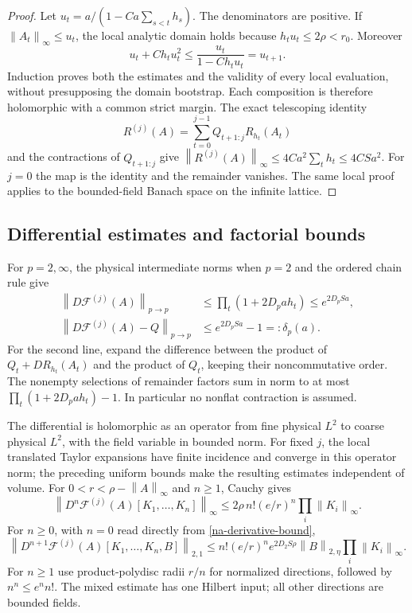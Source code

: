 \documentclass[11pt]{article}
\theoremstyle{remark}
\newcommand{\norm}[1]{\left\|#1\right\|}
\begin{document}
\begin{proof}
Let $u_t=a/(1-Ca\sum_{s<t}h_s)$. The denominators are positive.
If $\norm{A_t}_\infty\le u_t$, the local analytic domain holds
because $h_tu_t\le2\rho<r_0$. Moreover
\[
 u_t+Ch_tu_t^2\le\frac{u_t}{1-Ch_tu_t}=u_{t+1}.
\]
Induction proves both the estimates and the validity of every local
evaluation, without presupposing the domain bootstrap. Each
composition is therefore holomorphic with a common strict margin.
The exact telescoping identity
\[
 R^{(j)}(A)=\sum_{t=0}^{j-1}Q_{t+1:j}R_{h_t}(A_t)
\]
and the contractions of $Q_{t+1:j}$ give
$\norm{R^{(j)}(A)}_\infty\le4Ca^2\sum_t h_t\le4CSa^2$.
For $j=0$ the map is the identity and the remainder vanishes.
The same local proof applies to the bounded-field Banach space on
the infinite lattice.
\end{proof}

\subsection{Differential estimates and factorial bounds}
\label{na-differentials}

For $p=2,\infty$, the physical intermediate norms when $p=2$ and
the ordered chain rule give
\begin{align}
 \norm{D\mathcal F^{(j)}(A)}_{p\to p}
    &\le\prod_t(1+2D_pa h_t)\le e^{2D_pSa},
 \label{na-derivative-bound}\\
 \norm{D\mathcal F^{(j)}(A)-Q}_{p\to p}
    &\le e^{2D_pSa}-1=:\delta_p(a).
 \label{na-differential-deviation}
\end{align}
For the second line, expand the difference between the product of
$Q_t+DR_{h_t}(A_t)$ and the product of $Q_t$, keeping their
noncommutative order. The nonempty selections of remainder factors
sum in norm to at most $\prod_t(1+2D_pa h_t)-1$. In particular
no nonflat contraction is assumed.

The differential is holomorphic as an operator from fine physical
$L^2$ to coarse physical $L^2$, with the field variable in bounded
norm. For fixed $j$, the local translated Taylor expansions have
finite incidence and converge in this operator norm; the preceding
uniform bounds make the resulting estimates independent of volume.
For $0<r<\rho-\norm{A}_\infty$ and $n\ge1$, Cauchy gives
\begin{equation}
 \norm{D^n\mathcal F^{(j)}(A)[K_1,\ldots,K_n]}_\infty
 \le2\rho\,n!(e/r)^n\prod_i\norm{K_i}_\infty.
 \label{na-cauchy-infty}
\end{equation}
For $n\ge0$, with $n=0$ read directly from
\eqref{na-derivative-bound},
\begin{equation}
 \norm{D^{n+1}\mathcal F^{(j)}(A)[K_1,\ldots,K_n,B]}_{2,1}
 \le n!(e/r)^n e^{2D_2S\rho}
       \norm{B}_{2,\eta}\prod_i\norm{K_i}_\infty.
 \label{na-cauchy-mixed}
\end{equation}
For $n\ge1$ use product-polydisc radii $r/n$ for normalized
directions, followed by $n^n\le e^n n!$. The mixed estimate has one
Hilbert input; all other directions are bounded fields.
\end{document}
